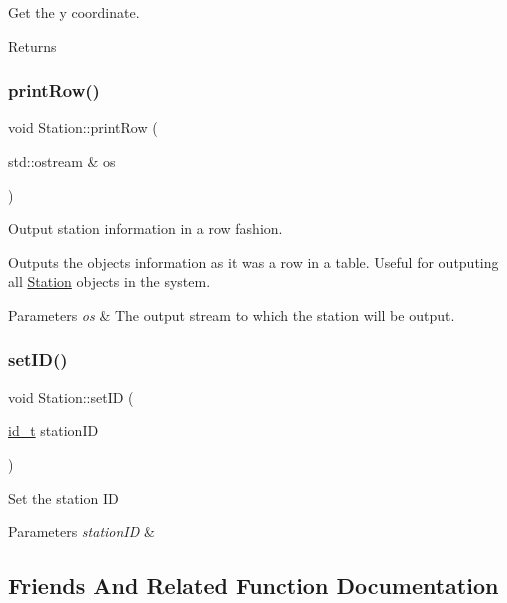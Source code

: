 Get the y coordinate. \begin{DoxyReturn}{Returns}

\end{DoxyReturn}
\mbox{\label{classStation_a66c028cdffd79bddd0704235b051ff4e}} 
\subsubsection{\texorpdfstring{print\+Row()}{printRow()}}
{\footnotesize\ttfamily void Station\+::print\+Row (\begin{DoxyParamCaption}\item[{std\+::ostream \&}]{os }\end{DoxyParamCaption})}



Output station information in a row fashion. 

Outputs the object\textquotesingle{}s information as it was a row in a table. Useful for outputing all \mbox{\hyperlink{classStation}{Station}} objects in the system.


\begin{DoxyParams}{Parameters}
{\em os} & The output stream to which the station will be output. \\
\hline
\end{DoxyParams}
\mbox{\label{classStation_a1cb215c1fea787806cfd116c7c32d350}} 
\subsubsection{\texorpdfstring{set\+I\+D()}{setID()}}
{\footnotesize\ttfamily void Station\+::set\+ID (\begin{DoxyParamCaption}\item[{\mbox{\hyperlink{project__utils_8h_a8f3a969054ad2200720b96e7e23dd4e1}{id\+\_\+t}}}]{station\+ID }\end{DoxyParamCaption})}

Set the station ID


\begin{DoxyParams}{Parameters}
{\em station\+ID} & \\
\hline
\end{DoxyParams}


\subsection{Friends And Related Function Documentation}
\mbox{\label{classStation_ae5ca3266f8eead5634eb5926438392da}} 
